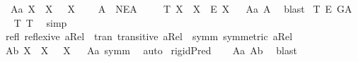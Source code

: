 \begin{isabellebody}
\ \ A{}a{\isacharcolon}\ {\isachardoublequoteopen}{\isasymlfloor}\isactrlbold {\isasymforall}X{\isachardot}\ {\isasymP}\ X\ \isactrlbold {\isasymrightarrow}\ \isactrlbold {\isasymbox}{\isacharparenleft}{\isasymP}\ X{\isacharparenright}{\isasymrfloor}{\isachardoublequoteclose}\ \ \isanewline
\ \ A{}{\isacharcolon}\ {\isachardoublequoteopen}{\isasymlfloor}{\isasymP}\ NE\isactrlsup A{\isasymrfloor}{\isachardoublequoteclose}\ \isanewline
\ \ \isanewline
{}\isamarkupfalse%
\ T{}{\isacharcolon}\ {\isachardoublequoteopen}{\isasymlfloor}\isactrlbold {\isasymforall}X{\isachardot}\ {\isasymP}\ X\ \isactrlbold {\isasymrightarrow}\ \isactrlbold {\isasymdiamond}\isactrlbold {\isasymexists}\isactrlsup E\ X{\isasymrfloor}{\isachardoublequoteclose}%
\ %
%
\isamarkupfalse%
\ A{}a\ A{}\ \isamarkupfalse%
\ blast%
%
%
\isanewline
{}\isamarkupfalse%
\ T{}{\isacharcolon}\ {\isachardoublequoteopen}{\isasymlfloor}\isactrlbold {\isasymdiamond}\isactrlbold {\isasymexists}\isactrlsup E\ G\isactrlsup A{\isasymrfloor}{\isachardoublequoteclose}%
\ %
%
\isamarkupfalse%
\ T{}\ T{}\ \isamarkupfalse%
\ simp%
%
%
\isanewline
\ \ \ \ \ \ \isanewline
{}\isamarkupfalse%
\ \ %
\isanewline
\ refl{\isacharcolon}\ {\isachardoublequoteopen}reflexive\ aRel{\isachardoublequoteclose}\ \ tran{\isacharcolon}\ {\isachardoublequoteopen}transitive\ aRel{\isachardoublequoteclose}\ \ symm{\isacharcolon}\ {\isachardoublequoteopen}symmetric\ aRel{\isachardoublequoteclose}\isanewline
\isanewline
{}\isamarkupfalse%
\ A{}b{\isacharcolon}\ {\isachardoublequoteopen}{\isasymlfloor}\isactrlbold {\isasymforall}X{\isachardot}\ \isactrlbold {\isasymnot}{\isacharparenleft}{\isasymP}\ X{\isacharparenright}\ \isactrlbold {\isasymrightarrow}\ \isactrlbold {\isasymbox}\isactrlbold {\isasymnot}{\isacharparenleft}{\isasymP}\ X{\isacharparenright}{\isasymrfloor}{\isachardoublequoteclose}%
\ %
%
\isamarkupfalse%
\ A{}a\ symm\ \isamarkupfalse%
\ auto%
%
%
\isanewline
{}\isamarkupfalse%
\ {\isachardoublequoteopen}{\isasymlfloor}rigidPred\ {\isasymP}{\isasymrfloor}{\isachardoublequoteclose}%
\ %
%
\isamarkupfalse%
\ A{}a\ A{}b\ \isamarkupfalse%
\ blast\ %

\end{isabellebody}
